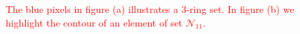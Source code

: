 \documentclass[smallextended]{svjour3}       %
\newcommand{\revision}[1]{\textcolor{red}{#1}}
\begin{document}
\begin{figure}[!h]
\center
	\hspace{40pt}%
	\caption{\revision{The blue pixels in figure (a) illustrates a $3$-ring set. In figure (b) we highlight the contour of an element of set $\mathcal{N}_{11}$.}}
\end{figure}
\end{document}
